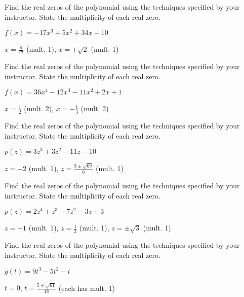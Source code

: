 \documentclass{ximera}
\begin{document}
\begin{problem}
Find the real zeros of the polynomial using the techniques specified by your instructor.  State the multiplicity of each real zero.

$f(x) = -17x^{3} + 5x^{2} + 34x - 10$

\begin{solution}
$x = \frac{5}{17}$ (mult. 1), $x = \pm \sqrt{2}$ (mult. 1)
\end{solution}

\end{problem}

\begin{problem}
Find the real zeros of the polynomial using the techniques specified by your instructor.  State the multiplicity of each real zero.

$f(x) = 36x^{4} - 12x^{3} - 11x^{2} + 2x + 1$

\begin{solution}
$x = \frac{1}{2}$ (mult. 2), $x = -\frac{1}{3}$ (mult. 2) 
\end{solution}
\end{problem}

\begin{problem}
Find the real zeros of the polynomial using the techniques specified by your instructor.  State the multiplicity of each real zero.

$p(z) = 3z^{3} + 3z^{2} - 11z - 10$

\begin{solution}
$z = -2$ (mult. 1), $z = \frac{3 \pm \sqrt{69}}{6}$ (mult. 1)
\end{solution}

\end{problem}

\begin{problem}
Find the real zeros of the polynomial using the techniques specified by your instructor.  State the multiplicity of each real zero.

$p(z) = 2z^4+z^3-7z^2-3z+3$

\begin{solution}
$z = -1$ (mult. 1), $z = \frac{1}{2}$ (mult. 1), $z = \pm \sqrt{3}$ (mult. 1)
\end{solution}

\end{problem}

\begin{problem}
Find the real zeros of the polynomial using the techniques specified by your instructor.  State the multiplicity of each real zero.

$g(t) = 9t^{3} - 5t^{2} - t$

\begin{solution}
$t = 0$, $t = \frac{5 \pm \sqrt{61}}{18}$ (each has mult. 1)
\end{solution}
\end{problem}
\end{document}
